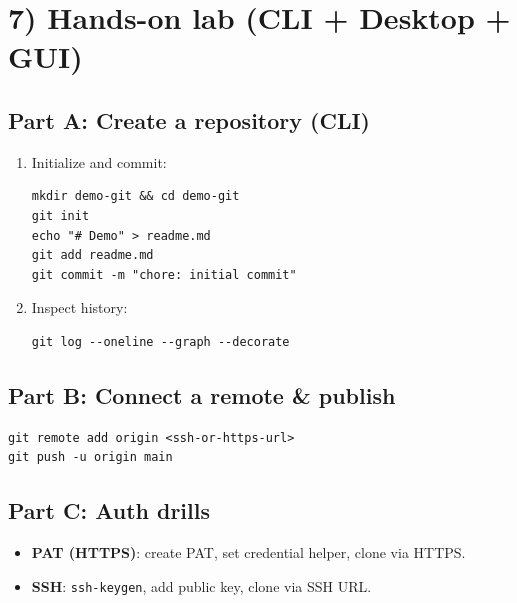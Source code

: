 \documentclass[11pt]{article}
\begin{document}
\section*{7) Hands-on lab (CLI + Desktop + GUI)}

\subsection*{Part A: Create a repository (CLI)}
\begin{enumerate}
  \item Initialize and commit:
\begin{verbatim}
mkdir demo-git && cd demo-git
git init
echo "# Demo" > readme.md
git add readme.md
git commit -m "chore: initial commit"
\end{verbatim}
  \item Inspect history:
\begin{verbatim}
git log --oneline --graph --decorate
\end{verbatim}
\end{enumerate}

\subsection*{Part B: Connect a remote \& publish}
\begin{verbatim}
git remote add origin <ssh-or-https-url>
git push -u origin main
\end{verbatim}

\subsection*{Part C: Auth drills}
\begin{itemize}
  \item \textbf{PAT (HTTPS)}: create PAT, set credential helper, clone via HTTPS.
  \item \textbf{SSH}: \texttt{ssh-keygen}, add public key, clone via SSH URL.
\end{itemize}
\end{document}
